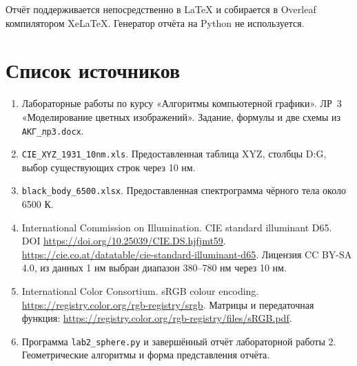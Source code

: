 \documentclass[a4paper,12pt]{article}
\newcommand{\code}[1]{\nolinkurl{#1}}
\begin{document}
Отчёт поддерживается непосредственно в LaTeX и собирается в Overleaf компилятором XeLaTeX. Генератор отчёта на Python не используется.

\section*{Список источников}
\begin{enumerate}[label={\arabic*.},leftmargin=0.7cm]
\item Лабораторные работы по курсу «Алгоритмы компьютерной графики». ЛР~3 «Моделирование цветных изображений». Задание, формулы и две схемы из \code{АКГ_лр3.docx}.
\item \code{CIE_XYZ_1931_10nm.xls}. Предоставленная таблица XYZ, столбцы D:G, выбор существующих строк через 10 нм.
\item \code{black_body_6500.xlsx}. Предоставленная спектрограмма чёрного тела около 6500 К.
\item International Commission on Illumination. CIE standard illuminant D65. DOI \url{https://doi.org/10.25039/CIE.DS.hjfjmt59}. \url{https://cie.co.at/datatable/cie-standard-illuminant-d65}. Лицензия CC BY-SA 4.0, из данных 1 нм выбран диапазон 380--780 нм через 10 нм.
\item International Color Consortium. sRGB colour encoding. \url{https://registry.color.org/rgb-registry/srgb}. Матрицы и передаточная функция: \url{https://registry.color.org/rgb-registry/files/sRGB.pdf}.
\item Программа \code{lab2_sphere.py} и завершённый отчёт лабораторной работы 2. Геометрические алгоритмы и форма представления отчёта.
\end{enumerate}
\end{document}
